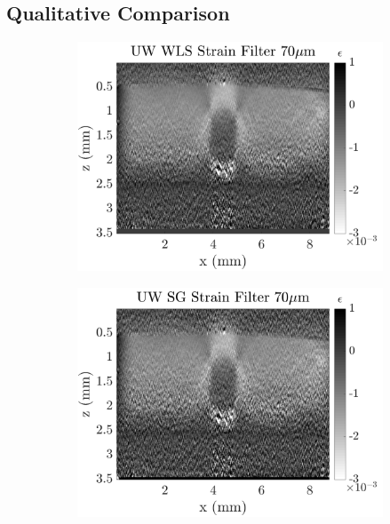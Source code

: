 \subsection{Qualitative Comparison}\label{qualitative1}

\begin{figure}[b!]
	\centering
    \begin{subfigure}{0.49\textwidth}
    	\centering
        \includegraphics[width=\textwidth]{figures/wls_fr70_lr0.png}
	\end{subfigure}
    \begin{subfigure}{0.49\textwidth}
    	\centering
        \includegraphics[width=\textwidth]{figures/uwsg_fr70_lr0.png}
	\end{subfigure}

\end{figure}
